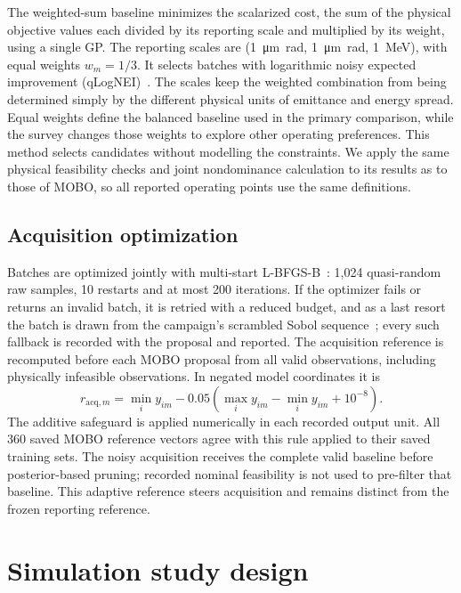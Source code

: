 \documentclass[aps,prab,reprint,superscriptaddress,amsmath,amssymb,floatfix]{revtex4-2}
\begin{document}
The weighted-sum baseline minimizes the scalarized cost, the sum of the physical objective
values each divided by its reporting scale and multiplied by its weight, using a single GP.
The reporting scales are (\SI{1}{\micro\metre\radian},
\SI{1}{\micro\metre\radian}, \SI{1}{\mega\electronvolt}), with equal weights $w_m = 1/3$.
It selects batches with logarithmic noisy expected improvement
(qLogNEI)~\cite{Ament2023}. The scales keep the
weighted combination from being determined simply by the different physical units of emittance
and energy spread. Equal weights define the balanced baseline used in the primary comparison,
while the survey changes those weights to explore other operating preferences. This method
selects candidates without modelling the constraints. We apply the same physical feasibility
checks and joint nondominance calculation to its results as to those of MOBO, so all reported
operating points use the same definitions.

\subsection{Acquisition optimization}
Batches are optimized jointly with multi-start L-BFGS-B~\cite{Byrd1995}: 1,024 quasi-random
raw samples, 10 restarts and at most 200 iterations. If the optimizer fails or returns an invalid
batch, it is retried with a reduced budget, and as a last resort the batch is drawn from the
campaign's scrambled Sobol sequence~\cite{Owen1998}; every such fallback is recorded with the
proposal and reported.
The acquisition reference is recomputed before each MOBO proposal from all
valid observations, including physically infeasible observations. In negated
model coordinates it is
\begin{equation}
 r_{\mathrm{acq},m}=\min_i y_{im}
 -0.05\left(\max_i y_{im}-\min_i y_{im}+10^{-8}\right).
\end{equation}
The additive safeguard is applied numerically in each recorded output unit.
All 360 saved MOBO reference vectors agree with this rule applied to their
saved training sets. The noisy acquisition receives the complete valid
baseline before posterior-based pruning; recorded nominal feasibility is not
used to pre-filter that baseline. This adaptive reference steers acquisition
and remains distinct from the frozen reporting reference.

\section{Simulation study design}
\label{sec:design}
\end{document}

